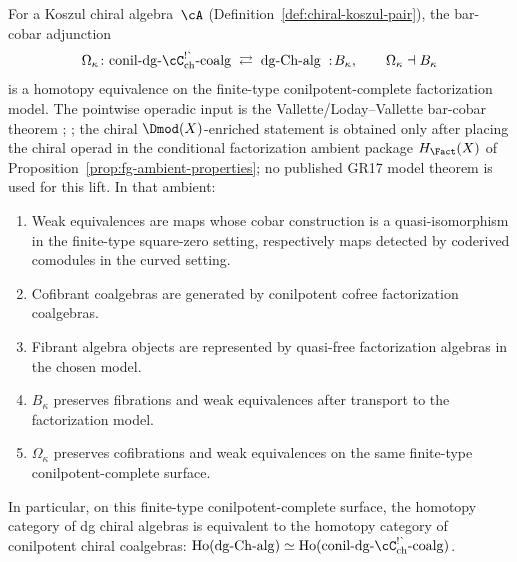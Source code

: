 \begin{theorem}
\label{thm:quillen-equivalence-chiral}
For a Koszul chiral algebra~$\cA$
\textup{(}Definition~\textup{\ref{def:chiral-koszul-pair})},
the bar-cobar adjunction
\[
\Omega_\kappa\colon
\mathrm{conil}\text{-}\mathrm{dg}\text{-}\cC^{\textup{!\textasciigrave}}_{\mathrm{ch}}\text{-}\mathrm{coalg}
\;\rightleftarrows\;
\mathrm{dg}\text{-}\mathrm{Ch\text{-}alg}
\;:\!B_\kappa,
\qquad
\Omega_\kappa\dashv B_\kappa
\]
is a homotopy equivalence on the finite-type
conilpotent-complete factorization model. The pointwise operadic input
is the Vallette/Loday--Vallette bar-cobar theorem
\textup{\cite[Theorem~2.1]{Val16}; \cite[Theorem~11.4.1]{LV12}}; the
chiral $\Dmod(X)$-enriched statement is obtained only after placing the
chiral operad in the conditional factorization ambient package
$H_{\Fact}(X)$ of Proposition~\ref{prop:fg-ambient-properties}; no
published GR17 model theorem is used for this lift. In that ambient:
\begin{enumerate}[label=\textup{(\roman*)}]
\item Weak equivalences are maps whose cobar construction is a
 quasi-isomorphism in the finite-type square-zero setting,
 respectively maps detected by coderived comodules in the curved
 setting.
\item Cofibrant coalgebras are generated by conilpotent cofree
 factorization coalgebras.
\item Fibrant algebra objects are represented by quasi-free
 factorization algebras in the chosen model.
\item $B_\kappa$ preserves fibrations and weak equivalences
 after transport to the factorization model.
\item $\Omega_\kappa$ preserves cofibrations and weak equivalences on
 the same finite-type conilpotent-complete surface.
\end{enumerate}
In particular, on this finite-type conilpotent-complete surface, the
homotopy category of dg chiral algebras is equivalent to the homotopy
category of conilpotent chiral coalgebras:
$\mathrm{Ho}(\mathrm{dg}\text{-}\mathrm{Ch\text{-}alg})
\simeq
\mathrm{Ho}(\mathrm{conil}\text{-}\mathrm{dg}\text{-}
\cC^{\textup{!\textasciigrave}}_{\mathrm{ch}}\text{-}\mathrm{coalg})$.
\end{theorem}

